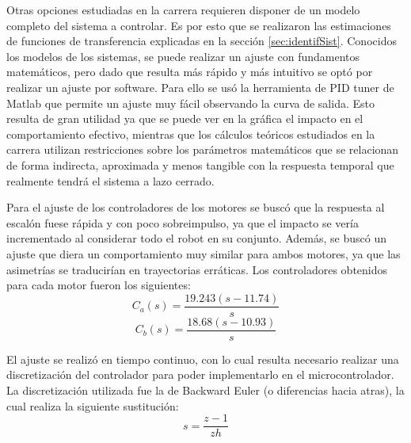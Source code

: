 \documentclass[10pt,conference,a4paper,onecolumn]{article}%
\begin{document}
Otras opciones estudiadas en la carrera requieren disponer de un modelo completo del sistema a controlar. Es por esto que se realizaron las estimaciones de funciones de transferencia explicadas en la sección \ref{sec:identifSist}. Conocidos los modelos de los sistemas, se puede realizar un ajuste con fundamentos matemáticos, pero dado que resulta más rápido y más intuitivo se optó por realizar un ajuste por software. Para ello se usó la herramienta de PID tuner de Matlab \cite{PID_tuner} que permite un ajuste muy fácil observando la curva de salida. Esto resulta de gran utilidad ya que se puede ver en la gráfica el impacto en el comportamiento efectivo, mientras que los cálculos teóricos estudiados en la carrera utilizan restricciones sobre los parámetros matemáticos que se relacionan de forma indirecta, aproximada y menos tangible con la respuesta temporal que realmente tendrá el sistema a lazo cerrado.

Para el ajuste de los controladores de los motores se buscó que la respuesta al escalón fuese rápida y con poco sobreimpulso, ya que el impacto se vería incrementado al considerar todo el robot en su conjunto. Además, se buscó un ajuste que diera un comportamiento muy similar para ambos motores, ya que las asimetrías se traducirían en trayectorias erráticas. Los controladores obtenidos para cada motor fueron los siguientes:
\begin{equation*}
C_a(s)= \frac{  19.243 (s-11.74)}{s}
\end{equation*}
\begin{equation*}
C_b(s)= \frac{ 18.68 (s-10.93)}{s}
\end{equation*}

El ajuste se realizó en tiempo continuo, con lo cual resulta necesario realizar una discretización del controlador para poder implementarlo en el microcontrolador. La discretización utilizada fue la de Backward Euler (o diferencias hacia atras), la cual realiza la siguiente sustitución:
\begin{equation*}
s=\frac{z-1}{zh}
\end{equation*}%
\end{document}
